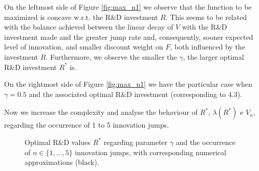 On the leftmost side of Figure \ref{fig:max_n1} we observe that the function to be maximized is concave w.r.t. the R\&D investment $R$. This seems to be related with the balance achieved between the linear decay of $V$ with the R\&D investment made and the greater jump rate and, consequently, sooner expected level of innovation, and smaller discount weight on $F$, both influenced by the investment $R$. 
Furthermore, we observe the smaller the $\gamma$, the larger optimal R\&D investment $R^*$ is.



On the rightmost side of Figure \ref{fig:max_n1} we have the particular case when $\gamma=0.5$ and the associated optimal R\&D investment (corresponding to 4.3). %

Now we increase the complexity and analyse the behaviour of $R^*$, $\lambda(R^*)$ e $V_n$, regarding the occurrence of 1 to 5 innovation jumps.

\begin{figure}[!htb]
	\begin{subfigmatrix}{2}
	\end{subfigmatrix}
	\caption{Optimal R\&D values $R^*$ regarding parameter $\gamma$ and the occurrence of $n\in \{1,...,5\}$ innovation jumps, with corresponding numerical approximations (black). }
	\label{fig:max_nR}
\end{figure}

